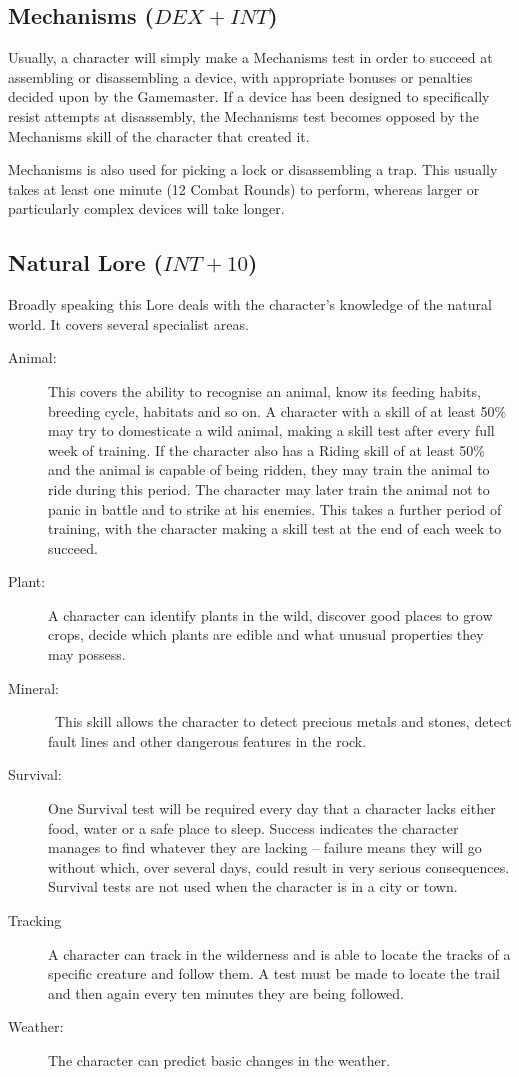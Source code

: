 \subsection{Mechanisms ($DEX+INT$)}
Usually, a character will simply make a Mechanisms test in order to succeed at assembling or disassembling a device, with appropriate bonuses or penalties decided upon by the Gamemaster. If a device has been designed to specifically resist attempts at disassembly, the Mechanisms test becomes opposed by the Mechanisms skill of the character that created it. 

Mechanisms is also used for picking a lock or disassembling a trap. This usually takes at least one minute (12 Combat Rounds) to perform, whereas larger or particularly complex devices will take longer.

\subsection{Natural Lore ($INT+10$)}
Broadly speaking this Lore deals with the character’s knowledge of the natural world. It covers several specialist areas.
\begin{description}
	\item[Animal:] This covers the ability to recognise an animal, know its feeding habits, breeding cycle, habitats and so on. A character with a skill of at least 50\% may try to domesticate a wild animal, making a skill test after every full week of training. If the character also has a Riding skill of at least 50\% and the animal is capable of being ridden, they may train the animal to ride during this period. The character may later train the animal not to panic in battle and to strike at his enemies. This takes a further period of training, with the character making a skill test at the end of each week to succeed. 
	\item[Plant:] A character can identify plants in the wild, discover good places to grow crops, decide which plants are edible and what unusual properties they may possess.
	\item[Mineral:]  This skill allows the character to detect precious metals and stones, detect fault lines and other dangerous features in the rock.
	\item[Survival:] One Survival test will be required every day that a character lacks either food, water or a safe place to sleep. Success indicates the character manages to find whatever they are lacking – failure means they will go without which, over several days, could result in very serious consequences. Survival tests are not used when the character is in a city or town. 
	\item[Tracking] A character can track in the wilderness and is able to locate the tracks of a specific creature and follow them. A test must be made to locate the trail and then again every ten minutes they are being followed. 
	\item[Weather:] The character can predict basic changes in the weather.
\end{description}

